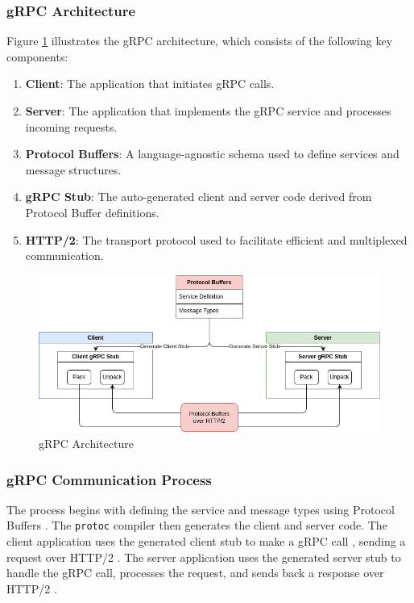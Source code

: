 \subsubsection{gRPC Architecture}

Figure \ref{fig:grpc} illustrates the gRPC architecture, which consists of the following key components:
\begin{enumerate}
    \item \textbf{Client}: The application that initiates gRPC calls.
    \item \textbf{Server}: The application that implements the gRPC service and processes incoming requests.
    \item \textbf{Protocol Buffers}: A language-agnostic schema used to define services and message structures.
    \item \textbf{gRPC Stub}: The auto-generated client and server code derived from Protocol Buffer definitions.
    \item \textbf{HTTP/2}: The transport protocol used to facilitate efficient and multiplexed communication.
\end{enumerate}

\begin{figure}[H]
    \centering
    \includegraphics[width=\textwidth]{figures/gRPC_architecture.drawio.png}
    \caption{gRPC Architecture}
    \label{fig:grpc}
\end{figure}

\subsubsection{gRPC Communication Process}
The process begins with defining the service and message types using Protocol Buffers \cite{protocol_buffers_overview}. The \texttt{protoc} compiler then generates the client and server code. The client application uses the generated client stub to make a gRPC call \cite{grpc_api}, sending a request over HTTP/2 \cite{grpc_http2}. The server application uses the generated server stub to handle the gRPC call, processes the request, and sends back a response  over HTTP/2 \cite{grpc_api}.


